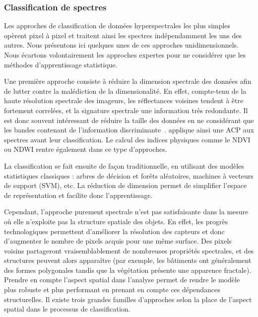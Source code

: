 \subsubsection{Classification de spectres}

Les approches de classification de données hyperspectrales les plus simples opèrent pixel à pixel et traitent ainsi les spectres indépendamment les uns des autres. Nous présentons ici quelques unes de ces approches unidimensionnels. Nous écartons volontairement les approches expertes pour ne considérer que les méthodes d'apprentissage statistique.

Une première approche consiste à réduire la dimension spectrale des données afin de lutter contre la malédiction de la dimensionalité. En effet, compte-tenu de la haute résolution spectrale des imageurs, les réflectances voisines tendent à être fortement correlées, et la signature spectrale une information très redondante. Il est donc souvent intéressant de réduire la taille des données en ne considérant que les bandes contenant de l'information discriminante~\cite{le_bris_extraction_2015,bevilacqua_unsupervised_2017}. \citet{rodarmel_principal_2002} applique ainsi une \gls{ACP} aux spectres avant leur classification. Le calcul des indices physiques comme le \gls{NDVI} ou \gls{NDWI} rentre également dans ce type d'approches.

La classification se fait ensuite de façon traditionnelle, en utilisant des modèles statistiques classiques : arbres de décision et forêts aléatoires, machines à vecteurs de support (SVM), etc. La réduction de dimension permet de simplifier l'espace de représentation et facilite donc l'apprentissage.

Cependant, l'approche purement spectrale n'est pas satisfaisante dans la mesure où elle n'exploite pas la structure spatiale des objets. En effet, les progrès technologiques permettent d'améliorer la résolution des capteurs et donc d'augmenter le nombre de pixels acquis pour une même surface. Des pixels voisins partageront vraisemblablement de nombreuses propriétés spectrales, et des structures peuvent alors apparaître (par exemple, les bâtiments ont généralement des formes polygonales tandis que la végétation présente une apparence fractale). Prendre en compte l'aspect spatial dans l'analyse permet de rendre le modèle plus robuste et plus performant en prenant en compte ces dépendances structurelles. Il existe trois grandes familles d'approches selon la place de l'aspect spatial dans le processus de classification.

